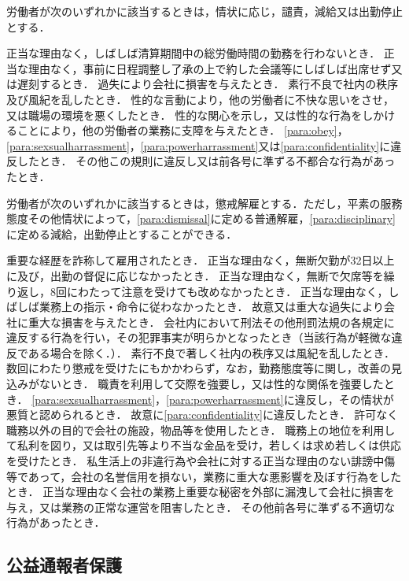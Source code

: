 \documentclass[11pt,a4paper]{jsarticle}
\begin{document}
労働者が次のいずれかに該当するときは，情状に応じ，譴責，減給又は出勤停止とする．
\label{para:disciplinary}
\begin{enumerate}
	\itm 正当な理由なく，しばしば清算期間中の総労働時間の勤務を行わないとき．
	\itm 正当な理由なく，事前に日程調整し了承の上で約した会議等にしばしば出席せず又は遅刻するとき．
	\itm 過失により会社に損害を与えたとき．
	\itm 素行不良で社内の秩序及び風紀を乱したとき．
	\itm 性的な言動により，他の労働者に不快な思いをさせ，又は職場の環境を悪くしたとき．
	\itm 性的な関心を示し，又は性的な行為をしかけることにより，他の労働者の業務に支障を与えたとき．
	\itm \ref{para:obey}，\ref{para:sexsualharrassment}，\ref{para:powerharrassment}又は\ref{para:confidentiality}に違反したとき．
	\itm その他この規則に違反し又は前各号に準ずる不都合な行為があったとき．
\end{enumerate}
\term
労働者が次のいずれかに該当するときは，懲戒解雇とする．ただし，平素の服務態度その他情状によって，\ref{para:dismissal}に定める普通解雇，\ref{para:disciplinary}に定める減給，出勤停止とすることができる．
\begin{enumerate}
	\itm 重要な経歴を詐称して雇用されたとき．
	\itm 正当な理由なく，無断欠勤が32日以上に及び，出勤の督促に応じなかったとき．
	\itm 正当な理由なく，無断で欠席等を繰り返し，8回にわたって注意を受けても改めなかったとき．
	\itm 正当な理由なく，しばしば業務上の指示・命令に従わなかったとき．
	\itm 故意又は重大な過失により会社に重大な損害を与えたとき．
	\itm 会社内において刑法その他刑罰法規の各規定に違反する行為を行い，その犯罪事実が明らかとなったとき（当該行為が軽微な違反である場合を除く．）．
	\itm 素行不良で著しく社内の秩序又は風紀を乱したとき．
	\itm 数回にわたり懲戒を受けたにもかかわらず，なお，勤務態度等に関し，改善の見込みがないとき．
	\itm 職責を利用して交際を強要し，又は性的な関係を強要したとき．
	\itm \ref{para:sexsualharrassment}，\ref{para:powerharrassment}に違反し，その情状が悪質と認められるとき．
	\itm 故意に\ref{para:confidentiality}に違反したとき．
	\itm 許可なく職務以外の目的で会社の施設，物品等を使用したとき．
	\itm 職務上の地位を利用して私利を図り，又は取引先等より不当な金品を受け，若しくは求め若しくは供応を受けたとき．
	\itm 私生活上の非違行為や会社に対する正当な理由のない誹謗中傷等であって，会社の名誉信用を損ない，業務に重大な悪影響を及ぼす行為をしたとき．
	\itm 正当な理由なく会社の業務上重要な秘密を外部に漏洩して会社に損害を与え，又は業務の正常な運営を阻害したとき．
	\itm その他前各号に準ずる不適切な行為があったとき．
\end{enumerate}

\subsection{公益通報者保護}
\end{document}
